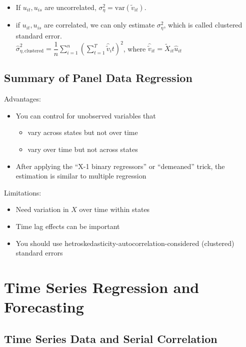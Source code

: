 \documentclass{article}
\newcommand{\sumlimits}{\sum \limits _{i=1}^{n}}
\newcommand{\sumlimitsT}{\sum \limits _{t=1}^{T}}
\begin{document}
\begin{itemize}
	\item If $u_{it}, u_{is}$ are uncorrelated, $\sigma^2_\eta = \text{var}(\tilde{v}_{it})$.
	\item if $u_{it}, u_{is}$ are correlated, we can only estimate $\sigma^2_\eta$,
					which is called clustered standard error.\\
					$\hat{\sigma}^2_{\eta, \text{clustered}} =
					\dfrac{1}{n} \sumlimits \left(
						\sumlimitsT \hat{\tilde{v}}_it
					\right)^2
					$, where $\hat{\tilde{v}}_{it} = \tilde{X}_{it} \hat{u}_{it}$
\end{itemize}

\subsection{Summary of Panel Data Regression}

Advantages:
\begin{itemize}
	\item You can control for unobserved variables that
	\begin{itemize}
		\item vary across states but not over time
		\item vary over time but not across states
	\end{itemize}
	\item After applying the ``X-1 binary regressors'' or ``demeaned'' trick, the estimation is similar to multiple regression
\end{itemize}

Limitations:
\begin{itemize}
	\item Need variation in $X$ over time within states
	\item Time lag effects can be important
	\item You should use hetroskedasticity-autocorrelation-considered (clustered) standard errors
\end{itemize}

\section{Time Series Regression and Forecasting}

\subsection{Time Series Data and Serial Correlation}
\end{document}
